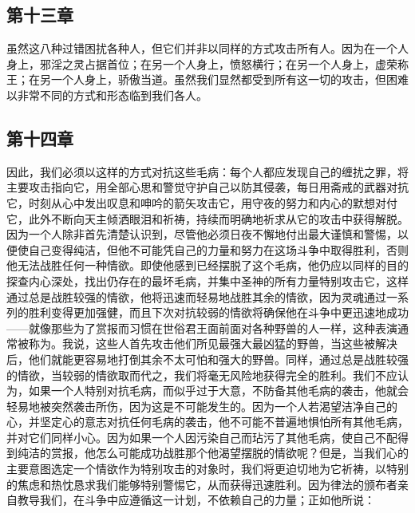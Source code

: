 
\subsection{第十三章}

\par

虽然这八种过错困扰各种人，但它们并非以同样的方式攻击所有人。因为在一个人身上，邪淫之灵占据首位；在另一个人身上，愤怒横行；在另一个人身上，虚荣称王；在另一个人身上，骄傲当道。虽然我们显然都受到所有这一切的攻击，但困难以非常不同的方式和形态临到我们各人。\par


\subsection{第十四章}

\par

因此，我们必须以这样的方式对抗这些毛病：每个人都应发现自己的缠扰之罪，将主要攻击指向它，用全部心思和警觉守护自己以防其侵袭，每日用斋戒的武器对抗它，时刻从心中发出叹息和呻吟的箭矢攻击它，用守夜的努力和内心的默想对付它，此外不断向天主倾洒眼泪和祈祷，持续而明确地祈求从它的攻击中获得解脱。因为一个人除非首先清楚认识到，尽管他必须日夜不懈地付出最大谨慎和警惕，以便使自己变得纯洁，但他不可能凭自己的力量和努力在这场斗争中取得胜利，否则他无法战胜任何一种情欲。即使他感到已经摆脱了这个毛病，他仍应以同样的目的探查内心深处，找出仍存在的最坏毛病，并集中圣神的所有力量特别攻击它，这样通过总是战胜较强的情欲，他将迅速而轻易地战胜其余的情欲，因为灵魂通过一系列的胜利变得更加强健，而且下次对抗较弱的情欲将确保他在斗争中更迅速地成功——就像那些为了赏报而习惯在世俗君王面前面对各种野兽的人一样，这种表演通常被称为。我说，这些人首先攻击他们所见最强大最凶猛的野兽，当这些被解决后，他们就能更容易地打倒其余不太可怕和强大的野兽。同样，通过总是战胜较强的情欲，当较弱的情欲取而代之，我们将毫无风险地获得完全的胜利。我们不应认为，如果一个人特别对抗毛病，而似乎过于大意，不防备其他毛病的袭击，他就会轻易地被突然袭击所伤，因为这是不可能发生的。因为一个人若渴望洁净自己的心，并坚定心的意志对抗任何毛病的袭击，他不可能不普遍地惧怕所有其他毛病，并对它们同样小心。因为如果一个人因污染自己而玷污了其他毛病，使自己不配得到纯洁的赏报，他怎么可能成功战胜那个他渴望摆脱的情欲呢？但是，当我们心的主要意图选定一个情欲作为特别攻击的对象时，我们将更迫切地为它祈祷，以特别的焦虑和热忱恳求我们能够特别警惕它，从而获得迅速胜利。因为律法的颁布者亲自教导我们，在斗争中应遵循这一计划，不依赖自己的力量；正如他所说：\par


